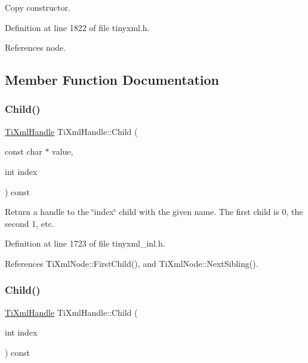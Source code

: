 Copy constructor. 



Definition at line 1822 of file tinyxml.\+h.



References node.



\subsection{Member Function Documentation}
\hypertarget{class_ti_xml_handle_a9903b035444ee36450fe00ede403f920}{}\label{class_ti_xml_handle_a9903b035444ee36450fe00ede403f920} 
\subsubsection{\texorpdfstring{Child()}{Child()}\hspace{0.1cm}{\footnotesize\ttfamily [1/3]}}
{\footnotesize\ttfamily \hyperlink{class_ti_xml_handle}{Ti\+Xml\+Handle} Ti\+Xml\+Handle\+::\+Child (\begin{DoxyParamCaption}\item[{const char $\ast$}]{value,  }\item[{int}]{index }\end{DoxyParamCaption}) const}

Return a handle to the \char`\"{}index\char`\"{} child with the given name. The first child is 0, the second 1, etc. 

Definition at line 1723 of file tinyxml\+\_\+inl.\+h.



References Ti\+Xml\+Node\+::\+First\+Child(), and Ti\+Xml\+Node\+::\+Next\+Sibling().

\hypertarget{class_ti_xml_handle_a32585942abb28e03eea9c5223f38a659}{}\label{class_ti_xml_handle_a32585942abb28e03eea9c5223f38a659} 
\subsubsection{\texorpdfstring{Child()}{Child()}\hspace{0.1cm}{\footnotesize\ttfamily [2/3]}}
{\footnotesize\ttfamily \hyperlink{class_ti_xml_handle}{Ti\+Xml\+Handle} Ti\+Xml\+Handle\+::\+Child (\begin{DoxyParamCaption}\item[{int}]{index }\end{DoxyParamCaption}) const}

